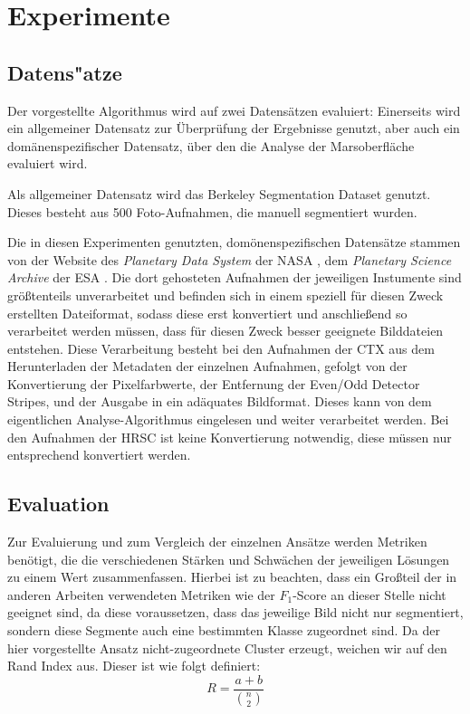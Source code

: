 \chapter{Experimente}
\label{chap:experimente}

\section{Datens"atze}
\label{sec:datensätze}

Der vorgestellte Algorithmus wird auf zwei Datensätzen evaluiert: Einerseits wird ein allgemeiner Datensatz zur Überprüfung der Ergebnisse genutzt, aber auch ein domänenspezifischer Datensatz, über den die Analyse der Marsoberfläche evaluiert wird. 

Als allgemeiner Datensatz wird das Berkeley Segmentation Dataset \cite{bsd500} genutzt. Dieses besteht aus 500 Foto-Aufnahmen, die manuell segmentiert wurden.

Die in diesen Experimenten genutzten, domönenspezifischen Datensätze stammen von der Website des \textit{Planetary Data System} der NASA \cite{pds}, \bzw dem \textit{Planetary Science Archive} der ESA \cite{psa}. Die dort gehosteten Aufnahmen der jeweiligen Instumente sind größtenteils unverarbeitet und befinden sich in einem speziell für diesen Zweck erstellten Dateiformat, sodass diese erst konvertiert und anschließend so verarbeitet werden müssen, dass für diesen Zweck besser geeignete Bilddateien entstehen.
Diese Verarbeitung besteht bei den Aufnahmen der CTX aus dem Herunterladen der Metadaten der einzelnen Aufnahmen, gefolgt von der Konvertierung der Pixelfarbwerte, der Entfernung der Even/Odd Detector Stripes, und der Ausgabe in ein adäquates Bildformat. Dieses kann von dem eigentlichen Analyse-Algorithmus eingelesen und weiter verarbeitet werden. Bei den Aufnahmen der HRSC ist keine Konvertierung notwendig, diese müssen nur entsprechend konvertiert werden.

\section{Evaluation}
\label{sec:Evaluation}

Zur Evaluierung und zum Vergleich der einzelnen Ansätze werden Metriken benötigt, die die verschiedenen Stärken und Schwächen der jeweiligen Lösungen zu einem Wert zusammenfassen. Hierbei ist zu beachten, dass ein Großteil der in anderen Arbeiten verwendeten Metriken wie \bspw der $F_1$-Score an dieser Stelle nicht geeignet sind, da diese voraussetzen, dass das jeweilige Bild nicht nur segmentiert, sondern diese Segmente auch eine bestimmten Klasse zugeordnet sind. Da der hier vorgestellte Ansatz nicht-zugeordnete Cluster erzeugt, weichen wir auf den Rand Index\cite{randindex} aus. Dieser ist wie folgt definiert:
\[R=\frac{a+b}{\binom{n}{2}}\]

